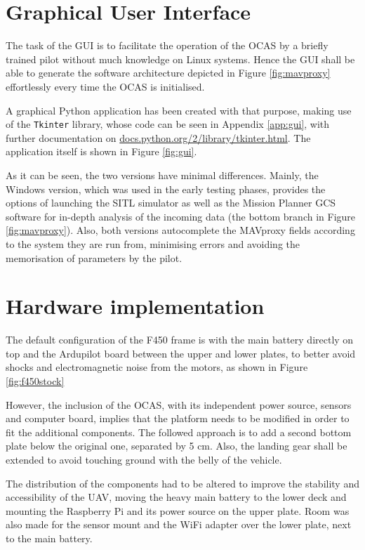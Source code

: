 \section{Graphical User Interface}

The task of the GUI is to facilitate the operation of the OCAS by a briefly trained pilot without much knowledge on Linux systems.
Hence the GUI shall be able to generate the software architecture depicted in Figure \ref{fig:mavproxy} effortlessly every time the OCAS is initialised.

A graphical Python application has been created with that purpose, making use of the \texttt{Tkinter} library, whose code can be seen in Appendix \ref{app:gui}, with further documentation on \url{docs.python.org/2/library/tkinter.html}.
The application itself is shown in Figure \ref{fig:gui}.



As it can be seen, the two versions have minimal differences.
Mainly, the Windows version, which was used in the early testing phases, provides the options of launching the SITL simulator as well as the Mission Planner GCS software for in-depth analysis of the incoming data (the bottom branch in Figure \ref{fig:mavproxy}).
Also, both versions autocomplete the MAVproxy fields according to the system they are run from, minimising errors and avoiding the memorisation of parameters by the pilot.


\section{Hardware implementation}

The default configuration of the F450 frame is with the main battery directly on top and the Ardupilot board between the upper and lower plates, to better avoid shocks and electromagnetic noise from the motors, as shown in Figure \ref{fig:f450stock}



However, the inclusion of the OCAS, with its independent power source, sensors and computer board, implies that the platform needs to be modified in order to fit the additional components.
The followed approach is to add a second bottom plate below the original one, separated by 5 cm.
Also, the landing gear shall be extended to avoid touching ground with the belly of the vehicle.

The distribution of the components had to be altered to improve the stability and accessibility of the UAV, moving the heavy main battery to the lower deck and mounting the Raspberry Pi and its power source on the upper plate.
Room was also made for the sensor mount and the WiFi adapter over the lower plate, next to the main battery.

